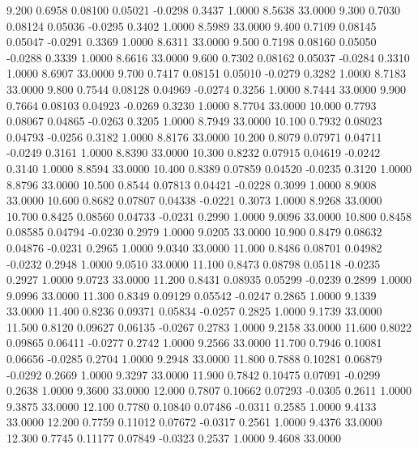    9.200   0.6958   0.08100   0.05021  -0.0298   0.3437   1.0000   8.5638  33.0000
   9.300   0.7030   0.08124   0.05036  -0.0295   0.3402   1.0000   8.5989  33.0000
   9.400   0.7109   0.08145   0.05047  -0.0291   0.3369   1.0000   8.6311  33.0000
   9.500   0.7198   0.08160   0.05050  -0.0288   0.3339   1.0000   8.6616  33.0000
   9.600   0.7302   0.08162   0.05037  -0.0284   0.3310   1.0000   8.6907  33.0000
   9.700   0.7417   0.08151   0.05010  -0.0279   0.3282   1.0000   8.7183  33.0000
   9.800   0.7544   0.08128   0.04969  -0.0274   0.3256   1.0000   8.7444  33.0000
   9.900   0.7664   0.08103   0.04923  -0.0269   0.3230   1.0000   8.7704  33.0000
  10.000   0.7793   0.08067   0.04865  -0.0263   0.3205   1.0000   8.7949  33.0000
  10.100   0.7932   0.08023   0.04793  -0.0256   0.3182   1.0000   8.8176  33.0000
  10.200   0.8079   0.07971   0.04711  -0.0249   0.3161   1.0000   8.8390  33.0000
  10.300   0.8232   0.07915   0.04619  -0.0242   0.3140   1.0000   8.8594  33.0000
  10.400   0.8389   0.07859   0.04520  -0.0235   0.3120   1.0000   8.8796  33.0000
  10.500   0.8544   0.07813   0.04421  -0.0228   0.3099   1.0000   8.9008  33.0000
  10.600   0.8682   0.07807   0.04338  -0.0221   0.3073   1.0000   8.9268  33.0000
  10.700   0.8425   0.08560   0.04733  -0.0231   0.2990   1.0000   9.0096  33.0000
  10.800   0.8458   0.08585   0.04794  -0.0230   0.2979   1.0000   9.0205  33.0000
  10.900   0.8479   0.08632   0.04876  -0.0231   0.2965   1.0000   9.0340  33.0000
  11.000   0.8486   0.08701   0.04982  -0.0232   0.2948   1.0000   9.0510  33.0000
  11.100   0.8473   0.08798   0.05118  -0.0235   0.2927   1.0000   9.0723  33.0000
  11.200   0.8431   0.08935   0.05299  -0.0239   0.2899   1.0000   9.0996  33.0000
  11.300   0.8349   0.09129   0.05542  -0.0247   0.2865   1.0000   9.1339  33.0000
  11.400   0.8236   0.09371   0.05834  -0.0257   0.2825   1.0000   9.1739  33.0000
  11.500   0.8120   0.09627   0.06135  -0.0267   0.2783   1.0000   9.2158  33.0000
  11.600   0.8022   0.09865   0.06411  -0.0277   0.2742   1.0000   9.2566  33.0000
  11.700   0.7946   0.10081   0.06656  -0.0285   0.2704   1.0000   9.2948  33.0000
  11.800   0.7888   0.10281   0.06879  -0.0292   0.2669   1.0000   9.3297  33.0000
  11.900   0.7842   0.10475   0.07091  -0.0299   0.2638   1.0000   9.3600  33.0000
  12.000   0.7807   0.10662   0.07293  -0.0305   0.2611   1.0000   9.3875  33.0000
  12.100   0.7780   0.10840   0.07486  -0.0311   0.2585   1.0000   9.4133  33.0000
  12.200   0.7759   0.11012   0.07672  -0.0317   0.2561   1.0000   9.4376  33.0000
  12.300   0.7745   0.11177   0.07849  -0.0323   0.2537   1.0000   9.4608  33.0000
